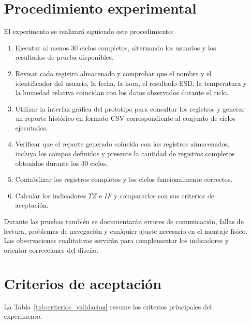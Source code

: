 \section{Procedimiento experimental}

El experimento se realizará siguiendo este procedimiento:

\begin{enumerate}

\item Ejecutar al menos 30 ciclos completos, alternando los usuarios y los
resultados de prueba disponibles.

\item Revisar cada registro almacenado y comprobar que el nombre y el
identificador del usuario, la fecha, la hora, el resultado ESD, la temperatura
y la humedad relativa coincidan con los datos observados durante el ciclo.

\item Utilizar la interfaz gráfica del prototipo para consultar los registros y
generar un reporte histórico en formato CSV correspondiente al conjunto de
ciclos ejecutados.

\item Verificar que el reporte generado coincida con los registros almacenados,
incluya los campos definidos y presente la cantidad de registros completos
obtenidos durante los 30 ciclos.

\item Contabilizar los registros completos y los ciclos funcionalmente
correctos.

\item Calcular los indicadores \(TZ\) e \(IF\) y compararlos con sus criterios de
aceptación.

\end{enumerate}

Durante las pruebas también se documentarán errores de comunicación, fallas de
lectura, problemas de navegación y cualquier ajuste necesario en el montaje
físico. Las observaciones cualitativas servirán para complementar los indicadores
y orientar correcciones del diseño.

\section{Criterios de aceptación}

La Tabla~\ref{tab:criterios_validacion} resume los criterios principales del
experimento.

